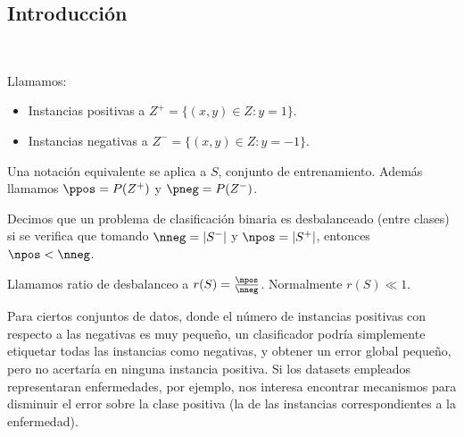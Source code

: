 \subsection{Introducción}
 \begin{frame}\
 \begin{definition}
 Llamamos:
 \begin{itemize}
  \item Instancias positivas a $Z^{+} = \{(x,y)\in Z: y=1\}$.
  \item Instancias negativas a $Z^{-} = \{(x,y)\in Z: y=-1\}$.
 \end{itemize}
 Una notación equivalente se aplica a $S$, conjunto de entrenamiento. Además llamamos $\ppos = P(Z^{+})$ y $\pneg = P(Z^{-})$.
 \end{definition}

 \begin{definition}
  Decimos que un problema de clasificación binaria es desbalanceado (entre clases) si se verifica que tomando 
  $\nneg = |S^{-}|$ y $\npos = |S^{+}|$, entonces $\npos < \nneg$.
  
  Llamamos ratio de desbalanceo a $r(S)=\frac{\npos}{\nneg}$. Normalmente $r(S) \ll 1$.
 \end{definition}

 Para ciertos conjuntos de datos, donde el número de instancias positivas con respecto a las negativas es muy pequeño, un clasificador podría simplemente
 etiquetar todas las instancias como negativas, y obtener un error global pequeño, pero no acertaría en ninguna instancia
 positiva. Si los datasets empleados representaran enfermedades, por ejemplo,
 nos interesa encontrar mecanismos para disminuir el error sobre la clase positiva (la de las instancias correspondientes
 a la enfermedad).
\end{frame}

